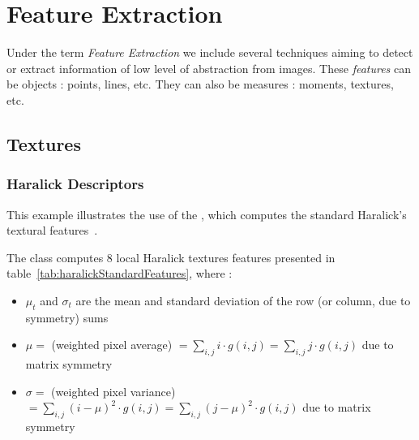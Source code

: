 \chapter{Feature Extraction}


Under the term {\em Feature Extraction} we include several techniques
aiming to detect or extract information of low level of abstraction
from images. These {\em features} can be objects : points, lines,
etc. They can also be measures : moments, textures, etc.

\section{Textures}
\subsection{Haralick Descriptors}

This example illustrates the use of the ,
which computes the standard Haralick's textural features~\cite{Haralick1973}.

The  class computes 8 local Haralick
textures features presented in table~\ref{tab:haralickStandardFeatures},
where :

\begin{itemize}
\item $\mu_t$ and $\sigma_t$ are the mean and standard deviation of the row
  (or column, due to symmetry) sums
\item $ \mu =  $ (weighted pixel average)
$ = \sum_{i,j}i \cdot g(i, j) =\sum_{i,j}j \cdot g(i, j) $ due to matrix
  symmetry
\item $ \sigma =  $ (weighted pixel variance) $ = \sum_{i,j}(i - \mu)^2 \cdot g(i, j) =\sum_{i,j}(j - \mu)^2 \cdot g(i, j)  $
due to matrix symmetry
\end{itemize}

